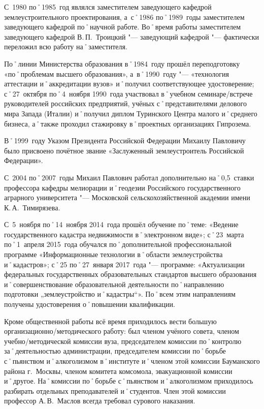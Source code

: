 С~1980 по˚1985~год являлся заместителем заведующего кафедрой землеустроительного проектирования, а~с˚1986 по˚1989~годы заместителем заведующего кафедрой по˚научной работе. Во˚время работы заместителем заведующего кафедрой В.\,П.~Троицкий "--- заведующий кафедрой "--- фактически переложил всю работу на˚заместителя.

По˚линии Министерства образования в˚1984~году прошёл переподготовку «по˚проблемам высшего образования», а~в˚1990~году "--- «технология аттестации и˚аккредитации вузов» и˚получил соответствующее удостоверение; с˚27~октября по˚4~ноября 1990~года участвовал в˚учебном семинаре\-/встрече руководителей российских предприятий, учёных с˚представителями делового мира Запада (Италии) и˚получил диплом Туринского Центра малого и˚среднего бизнеса, а˚также проходил стажировку в˚проектных организациях Гипрозема.

В˚1999~году Указом Президента Российской Федерации Михаилу Павловичу было присвоено  почётное звание «Заслуженный землеустроитель Российской Федерации». 

С~2004 по˚2007~годы Михаил Павлович работал дополнительно на˚0,5~ставки профессора кафедры мелиорации и˚геодезии Российского государственного аграрного университета "--- Московской сельскохозяйственной академии имени К.\,А.~Тимирязева.

С~5~ноября по˚14~ноября 2014~года прошёл обучение по˚теме: «Ведение государственного кадастра недвижимости в˚электронном виде»; с˚23~марта по˚1~апреля 2015~года обучался по˚дополнительной профессиональной программе «Информационные технологии в˚области землеустройства и˚кадастров»; с˚25 по˚27~января 2017~года "--- программе: «Актуализации федеральных государственных образовательных стандартов высшего образования и˚совершенствование образовательной деятельности по˚направлению подготовки „землеустройство и˚кадастры“». По˚всем этим направлениям получены удостоверения о˚повышении квалификации. 

Кроме общественной работы всё время приходилось вести большую организационно\-/методического работу: был членом учёного совета, членом учебно\-/методической комиссии вуза, председателем комиссии по˚контролю за˚деятельностью администрации, председателем комиссии по˚борьбе с˚пьянством и˚алкоголизмом в˚институте и˚членом этой комиссии Бауманского района г.~Москвы, членом комитета комсомола, эвакуационной комиссии и˚другое. На˚комиссии по˚борьбе с˚пьянством и˚алкоголизмом приходилось разбирать отдельных преподавателей и˚студентов. Член этой комиссии профессор А.\,В.~Маслов всегда требовал сурового наказания.
